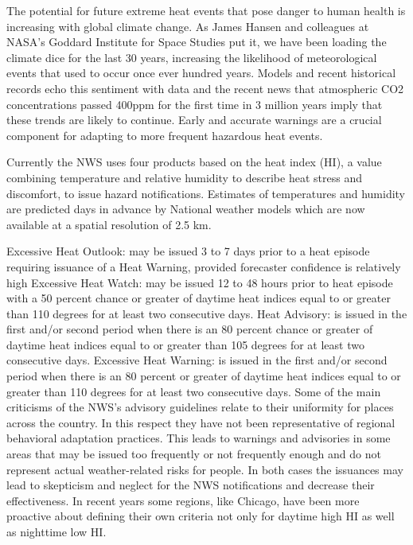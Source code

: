 The potential for future extreme heat events that pose danger to human health is increasing with global climate change. As James Hansen and colleagues at NASA’s Goddard Institute for Space Studies put it, we have been loading the climate dice for the last 30 years, increasing the likelihood of meteorological events that used to occur once ever hundred years. Models and recent historical records echo this sentiment with data and the recent news that atmospheric CO2 concentrations passed 400ppm for the first time in 3 million years imply that these trends are likely to continue.  Early and accurate warnings are a crucial component for adapting to more frequent hazardous heat events.

Currently the NWS uses four products based on the heat index (HI), a value combining temperature and relative humidity to describe heat stress and discomfort, to issue hazard notifications. Estimates of temperatures and humidity are predicted days in advance by National weather models which are now available at a spatial resolution of 2.5 km. 

Excessive Heat Outlook: may be issued 3 to 7 days prior to a heat episode requiring issuance of a Heat Warning, provided forecaster confidence is relatively high
Excessive Heat Watch: may be issued 12 to 48 hours prior to heat episode with a 50 percent chance or greater of daytime heat indices equal to or greater than 110 degrees for at least two consecutive days.
Heat Advisory: is issued in the first and/or second period when there is an 80 percent chance or greater of daytime heat indices equal to or greater than 105 degrees for at least two consecutive days.
Excessive Heat Warning: is issued in the first and/or second period when there is an 80 percent or greater of daytime heat indices equal to or greater than 110 degrees for at least two consecutive days.
Some of the main criticisms of the NWS’s advisory guidelines relate to their uniformity for places across the country. In this respect they have not been representative of regional behavioral adaptation practices. This leads to warnings and advisories in some areas that may be issued too frequently or not frequently enough and do not represent actual weather-related risks for people. In both cases the issuances may lead to skepticism and neglect for the NWS notifications and decrease their effectiveness. In recent years some regions, like Chicago, have been more proactive about defining their own criteria not only for daytime high HI as well as nighttime low HI. 


